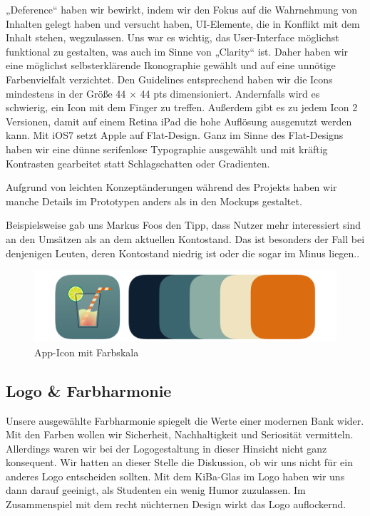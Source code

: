 	„Deference“ haben wir bewirkt, indem wir den Fokus auf die Wahrnehmung von Inhalten gelegt haben und versucht haben, UI-Elemente, die in Konflikt mit dem Inhalt stehen, wegzulassen. Uns war es wichtig, das User-Interface möglichst funktional zu gestalten, was auch im Sinne von „Clarity“ ist. Daher haben wir eine möglichst selbsterklärende Ikonographie gewählt und auf eine unnötige Farbenvielfalt verzichtet. Den Guidelines entsprechend haben wir die Icons mindestens in der Größe 44 $\times$ 44 pts dimensioniert. Andernfalls wird es schwierig, ein Icon mit dem Finger zu treffen. Außerdem gibt es zu jedem Icon 2 Versionen, damit auf einem Retina iPad die hohe Auflösung ausgenutzt werden kann. Mit iOS7 setzt Apple auf Flat-Design. Ganz im Sinne des Flat-Designs haben wir eine dünne serifenlose Typographie ausgewählt und mit kräftig Kontrasten gearbeitet statt Schlagschatten oder Gradienten.

	Aufgrund von leichten Konzeptänderungen während des Projekts haben wir manche Details im Prototypen anders als in den Mockups gestaltet.
	
	Beispielsweise gab uns Markus Foos den Tipp, dass Nutzer mehr interessiert sind an den Umsätzen als an dem aktuellen Kontostand. Das ist besonders der Fall bei denjenigen Leuten, deren Kontostand niedrig ist oder die sogar im Minus liegen.. \par

\begin{figure}[h]
	\centering
	\includegraphics[scale=.52]{Pictures/Logo}
	\caption{App-Icon mit Farbskala}
\end{figure}
\subsection{Logo \& Farbharmonie}
	Unsere ausgewählte Farbharmonie spiegelt die Werte einer modernen Bank wider. Mit den Farben wollen wir Sicherheit, Nachhaltigkeit und Seriosität vermitteln. Allerdings waren wir bei der Logogestaltung in dieser Hinsicht nicht ganz konsequent. Wir hatten an dieser Stelle die Diskussion, ob wir uns nicht für ein anderes Logo entscheiden sollten. Mit dem KiBa-Glas im Logo haben wir uns dann darauf geeinigt, als Studenten ein wenig Humor zuzulassen. Im Zusammenspiel mit dem recht nüchternen Design wirkt das Logo auflockernd.

